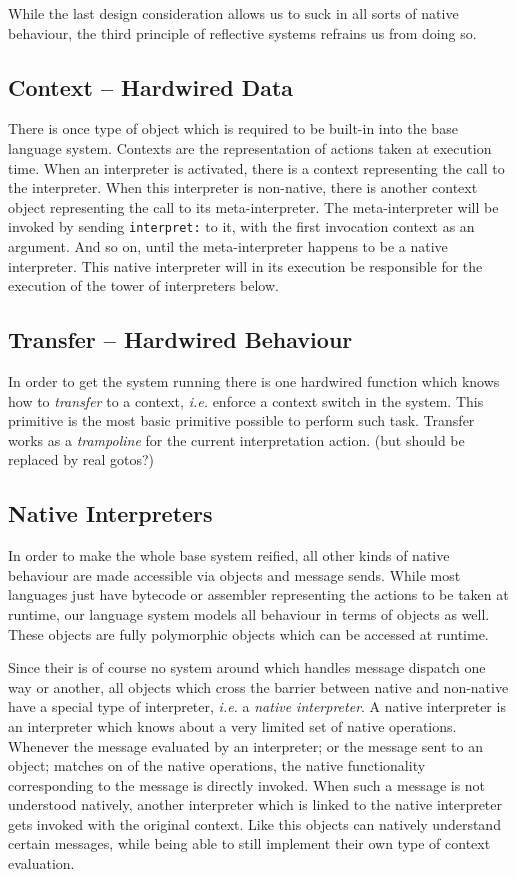 \documentclass{article}
\newcommand{\ie}{\emph{i.e.}\xspace}
\begin{document}
While the last design consideration allows us to suck in all sorts of
native behaviour, the third principle of reflective systems refrains us
from doing so. 

\subsection{Context -- Hardwired Data}
There is once type of object which is required to be built-in into the base
language system. Contexts are the representation of actions taken at
execution time. When an interpreter is activated, there is a context
representing the call to the interpreter. When this interpreter is non-native,
there is another context object representing the call to its meta-interpreter.
The meta-interpreter will be invoked by sending \verb$interpret:$ to it, with
the first invocation context as an argument. And so on, until the
meta-interpreter happens to be a native interpreter. This native interpreter
will in its execution be responsible for the execution of the tower of
interpreters below.

\subsection{Transfer -- Hardwired Behaviour}
In order to get the system running there is one hardwired
function which knows how to \emph{transfer} to a context, \ie enforce
a context switch in the system. This primitive is the most
basic primitive possible to perform such task. Transfer works as a
\emph{trampoline} for the current interpretation action. (but should be
replaced by real gotos?)

\subsection{Native Interpreters}
In order to make the whole base system reified, all other kinds of native
behaviour are made accessible via objects and message sends. While most
languages just have bytecode or assembler representing the actions to be taken
at runtime, our language system models all behaviour in terms of objects as
well. These objects are fully polymorphic objects which can be accessed at
runtime.

Since their is of course no system around which handles message
dispatch one way or another, all objects which cross the barrier between
native and non-native have a special type of interpreter, \ie a
\emph{native interpreter}. A native interpreter is an interpreter which knows
about a very limited set of native operations. Whenever the message evaluated
by an interpreter; or the message sent to an object; matches on of the native
operations, the native functionality corresponding to the message is directly
invoked. When such a message is not understood natively, another interpreter
which is linked to the native interpreter gets invoked with the original
context. Like this objects can natively understand certain messages, while
being able to still implement their own type of context evaluation.
\end{document}
